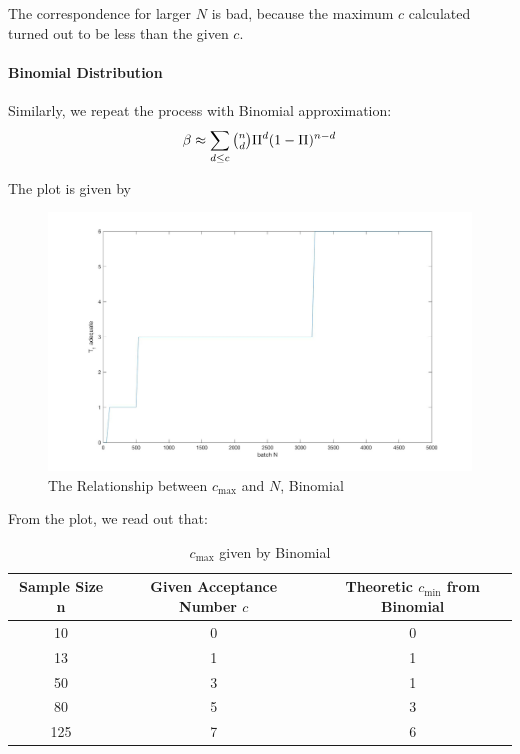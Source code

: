 \documentclass[a4paper]{article}
\begin{document}
The correspondence for larger $N$ is bad, because the maximum $c$ calculated turned out to be less than the given $c$.

\paragraph{Binomial Distribution}
Similarly, we repeat the process with Binomial approximation:
$$\beta \approx \sum_{d\leq c}\tbinom{n}{d}\Pi^d(1-\Pi)^{n-d}$$

The plot is given by
\begin{figure}[!htbp] 
\centering 
\includegraphics[width=1\linewidth]{beta-bino.jpg}  
\caption{The Relationship between $c_{\max}$ and $N$, Binomial} 
\end{figure}

\newpage

From the plot, we read out that:
\begin{table}[!htbp]
  \centering
    \begin{tabular}{ccc}
    \hline
    Sample Size n & Given Acceptance Number $c$ & Theoretic $c_{\min}$ from Binomial \\
    \hline
    10    & 0     & 0 \\
    13    & 1     & 1 \\
    50    & \cellcolor[rgb]{ .851,  .882,  .949}3     & \cellcolor[rgb]{ .851,  .882,  .949}1 \\
    80    & \cellcolor[rgb]{ .851,  .882,  .949}5     & \cellcolor[rgb]{ .851,  .882,  .949}3 \\
    125   & \cellcolor[rgb]{ .851,  .882,  .949}7     & \cellcolor[rgb]{ .851,  .882,  .949}6 \\
    \hline
    \end{tabular}%
    \caption{$c_{\max}$ given by Binomial}
\end{table}%
\end{document}
